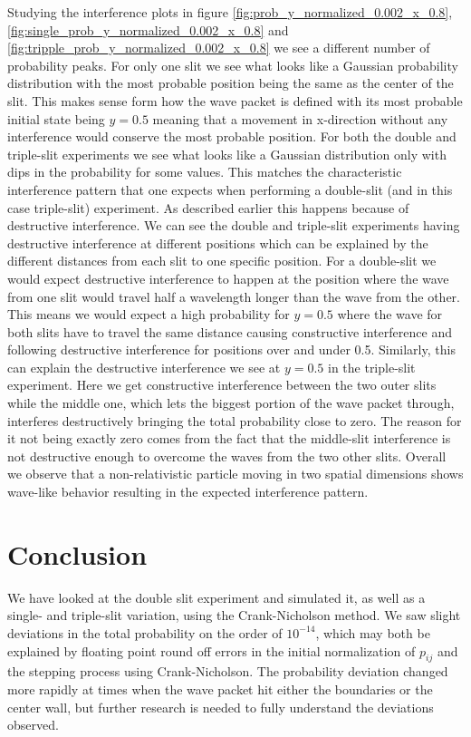 \documentclass[english,notitlepage,reprint,nofootinbib]{revtex4-1}  %
\begin{document}
Studying the interference plots in figure \ref{fig:prob_y_normalized_0.002_x_0.8}, \ref{fig:single_prob_y_normalized_0.002_x_0.8} and \ref{fig:tripple_prob_y_normalized_0.002_x_0.8}
we see a different number of probability peaks. For only one slit we see what looks like a Gaussian probability distribution with the most probable position being the same as the center of the slit. This makes sense form how the wave packet is defined with its most probable initial state being $y=0.5$ meaning that a movement in x-direction without any interference would conserve the most probable position. For both the double and triple-slit experiments we see what looks like a Gaussian distribution only with dips in the probability for some values. This matches the characteristic interference pattern that one expects when performing a double-slit (and in this case triple-slit) experiment. As described earlier this happens because of destructive interference. We can see the double and triple-slit experiments having destructive interference at different positions which can be explained by the different distances from each slit to one specific position. For a double-slit we would expect destructive interference to happen at the position where the wave from one slit would travel half a wavelength longer than the wave from the other. This means we would expect a high probability for $y=0.5$ where the wave for both slits have to travel the same distance causing constructive interference and following destructive interference for positions over and under 0.5. Similarly, this can explain the destructive interference we see at $y=0.5$ in the triple-slit experiment. Here we get constructive interference between the two outer slits while the middle one, which lets the biggest portion of the wave packet through, interferes destructively bringing the total probability close to zero. The reason for it not being exactly zero comes from the fact that the middle-slit interference is not destructive enough to overcome the waves from the two other slits. Overall we observe that a non-relativistic particle moving in two spatial dimensions shows wave-like behavior resulting in the expected interference pattern.


\section{Conclusion}\label{sec:conclusion}
We have looked at the double slit experiment and simulated it, as well as a single- and triple-slit variation, using the Crank-Nicholson method. We saw slight deviations in the total probability on the order of $10^{-14}$, which may both be explained by floating point round off errors in the initial normalization of $p_{ij}$ and the stepping process using Crank-Nicholson. The probability deviation changed more rapidly at times when the wave packet hit either the boundaries or the center wall, but further research is needed to fully understand the deviations observed.
\end{document}
